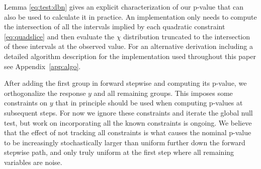 \documentclass{imsart}
\newcommand{\todo}{\textcolor{red}{\textbf{To do: }}}
\begin{document}
Lemma \ref{eq:test:dbn} gives an explicit characterization of our p-value
that can also be used to calculate it in practice. An implementation only needs to compute the intersection of all the intervals implied by each quadratic constraint \eqref{eq:quadslice} and then evaluate the $\chi$ distribution truncated to the intersection of these intervals at the observed value.
For an alternative
derivation including a detailed algorithm description for the implementation used throughout this paper see Appendix~\ref{app:algo}.

After adding the first group in forward stepwise and computing its p-value, we orthogonalize the response $y$ and all remaining groups. This imposes some constraints on $y$ that in principle should be used when computing p-values at subsequent steps. For now we ignore these constraints and iterate the global null test, but work on incorporating all the known constraints is ongoing. We believe that the effect of not tracking all constraints is what causes the nominal p-value to be increasingly stochastically larger than uniform further down the forward stepwise path, and only truly uniform at the first step where all remaining variables are noise.


%
%
%
%
%
%
\end{document}
